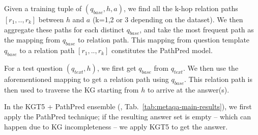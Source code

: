 \documentclass[11pt]{article}
\renewcommand\:{\colon} \newcommand{\sset}[1]{\left\{\,#1\,\right\}} \newcommand{\ssets}[1]{\left\{#1\right\}} \newcommand{\ssetn}[1]{\{\,#1\,\}}
\newcommand{\method}{\textsc{KGT5}}
\begin{document}
Given a training tuple of $(q_{base}, h, a)$, we find all the k-hop relation paths $[r_1,..,r_k]$ between $h$ and $a$ (k=1,2 or 3 depending on the dataset). We then aggregate these paths for each distinct $q_{base}$, and take the most frequent path as the mapping from $q_{base}$ to relation path. This mapping from question template $q_{base}$ to a relation path $[r_1,..,r_k]$ constitutes the PathPred model.

For a test question $(q_{text}, h)$, we first get $q_{base}$ from $q_{text}$. We then use the aforementioned mapping to get a relation path using $q_{base}$. This relation path is then used to traverse the KG starting from $h$ to arrive at the answer(s).

In the \method{} + PathPred ensemble (, Tab.~\ref{tab:metaqa-main-results}), we first apply the PathPred technique; if the resulting answer set is empty -- which can happen due to KG incompleteness -- we apply \method{} to get the answer.
\end{document}
